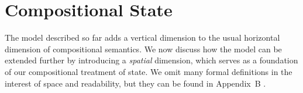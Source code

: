 \documentclass[acmsmall,nonacm]{acmart}
\newcommand{\kw}[1]{\ensuremath{ \mathsf{#1} }}
\newcommand{\que}{\circ}
\newcommand{\ans}{\bullet}
\begin{document}
%
%
%
%
%


\section{Compositional State} \label{sec:scomp} %


The model described so far adds a vertical dimension
to the usual horizontal dimension of compositional semantics.
We now discuss how the model can be extended further
by introducing a \emph{spatial} dimension,
which serves as a foundation of our compositional treatment of state.
We omit many formal definitions
in the interest of space and readability,
but they can be found in Appendix~B \citep{compcertoe-tr}.
\end{document}
